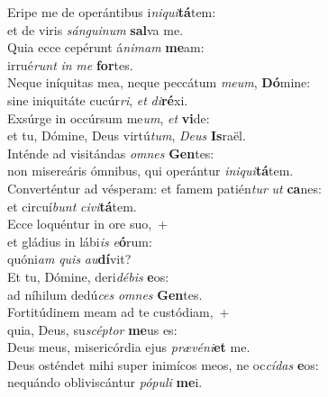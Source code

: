 \evenverse Eripe me de operántibus i\textit{ni}\textit{qui}\textbf{tá}tem:~\*\\
\evenverse et de viris \textit{sán}\textit{gui}\textit{num} \textbf{sal}va me.\\
\oddverse Quia ecce cepérunt á\textit{ni}\textit{mam} \textbf{me}am:~\*\\
\oddverse irrué\textit{runt} \textit{in} \textit{me} \textbf{for}tes.\\
\evenverse Neque iníquitas mea, neque peccátum \textit{me}\textit{um}, \textbf{Dó}mine:~\*\\
\evenverse sine iniquitáte cucúr\textit{ri}, \textit{et} \textit{di}\textbf{ré}xi.\\
\oddverse Exsúrge in occúrsum me\textit{um}, \textit{et} \textbf{vi}de:~\*\\
\oddverse et tu, Dómine, Deus virtú\textit{tum}, \textit{De}\textit{us} \textbf{Is}raël.\\
\evenverse Inténde ad visitándas \textit{om}\textit{nes} \textbf{Gen}tes:~\*\\
\evenverse non misereáris ómnibus, qui operántur \textit{i}\textit{ni}\textit{qui}\textbf{tá}tem.\\
\oddverse Converténtur ad vésperam: et famem patién\textit{tur} \textit{ut} \textbf{ca}nes:~\*\\
\oddverse et circuí\textit{bunt} \textit{ci}\textit{vi}\textbf{tá}tem.\\
\evenverse Ecce loquéntur in ore suo,~+\\
\evenverse  et gládius in lábi\textit{is} \textit{e}\textbf{ó}rum:~\*\\
\evenverse quóni\textit{am} \textit{quis} \textit{au}\textbf{dí}vit?\\
\oddverse Et tu, Dómine, deri\textit{dé}\textit{bis} \textbf{e}os:~\*\\
\oddverse ad níhilum dedú\textit{ces} \textit{om}\textit{nes} \textbf{Gen}tes.\\
\evenverse Fortitúdinem meam ad te custódiam,~+\\
\evenverse  quia, Deus, su\textit{scép}\textit{tor} \textbf{me}us es:~\*\\
\evenverse Deus meus, misericórdia ejus \textit{præ}\textit{vé}\textit{ni}\textbf{et} me.\\
\oddverse Deus osténdet mihi super inimícos meos, ne oc\textit{cí}\textit{das} \textbf{e}os:~\*\\
\oddverse nequándo obliviscántur \textit{pó}\textit{pu}\textit{li} \textbf{me}i.\\

